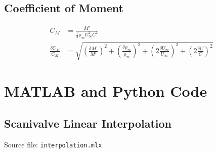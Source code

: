 \documentclass[runningheads]{llncs}
\begin{document}
\subsection{Coefficient of Moment}


\begin{align*}
    C_M &= \frac{M'}{\frac{1}{2}\rho_\infty U^2_\infty C^2} \\
    \frac{\delta C_M}{C_M} &= \sqrt{\left(\frac{\delta M'}{M'}\right)^2 + \left(\frac{\delta\rho_\infty}{\rho_\infty}\right)^2 + \left(2\frac{\delta U_\infty}{U_\infty}\right)^2 +\left(2\frac{\delta C}{C}\right)^2}
\end{align*}

\newpage
\section{MATLAB and Python Code}

\subsection{Scanivalve Linear Interpolation}

Source file: \verb|interpolation.mlx|
\end{document}
